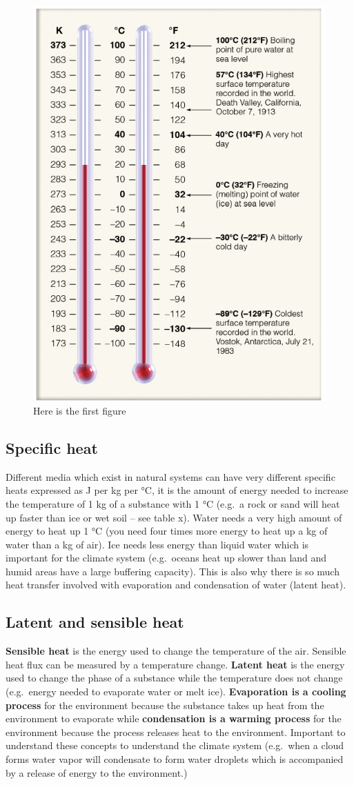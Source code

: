 \documentclass[oneside]{book}
\begin{document}
\begin{figure}

{\centering \includegraphics[width=0.5\linewidth]{figures/Figure115} 

}

\caption{Here is the first figure}\label{fig:Temperature2}
\end{figure}

\subsection{Specific heat}\label{specific-heat}

Different media which exist in natural systems can have very different
specific heats expressed as J per kg per °C, it is the amount of energy
needed to increase the temperature of 1 kg of a substance with 1 °C
(e.g.~a rock or sand will heat up faster than ice or wet soil -- see
table x). Water needs a very high amount of energy to heat up 1 °C (you
need four times more energy to heat up a kg of water than a kg of air).
Ice needs less energy than liquid water which is important for the
climate system (e.g.~oceans heat up slower than land and humid areas
have a large buffering capacity). This is also why there is so much heat
transfer involved with evaporation and condensation of water (latent
heat).

\subsection{Latent and sensible heat}\label{latent-and-sensible-heat}

\textbf{Sensible heat} is the energy used to change the temperature of
the air. Sensible heat flux can be measured by a temperature change.
\textbf{Latent heat} is the energy used to change the phase of a
substance while the temperature does not change (e.g.~energy needed to
evaporate water or melt ice). \textbf{Evaporation is a cooling process}
for the environment because the substance takes up heat from the
environment to evaporate while \textbf{condensation is a warming
process} for the environment because the process releases heat to the
environment. Important to understand these concepts to understand the
climate system (e.g.~when a cloud forms water vapor will condensate to
form water droplets which is accompanied by a release of energy to the
environment.)
\end{document}
